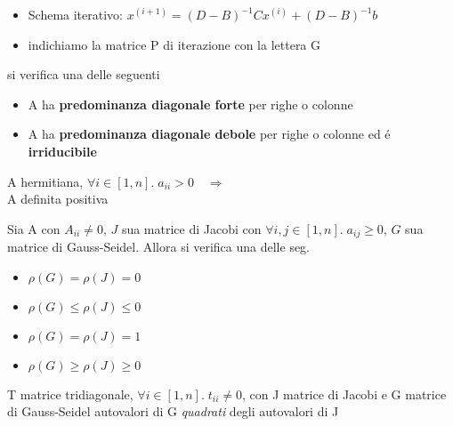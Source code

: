 \askip

\begin{itemize}
\item Schema iterativo: $ x^{(i+1)} = (D-B)^{-1}Cx^{(i)} + (D-B)^{-1}b $
\item indichiamo la matrice P di iterazione con la lettera G
\end{itemize}

\askip

 si verifica una delle seguenti
\begin{itemize}
\item A ha \textbf{predominanza diagonale forte} per righe o colonne
\item A ha \textbf{predominanza diagonale debole} per righe o colonne ed \'e \textbf{irriducibile}
\end{itemize}

\askip

A hermitiana, $ \forall i \in [1,n]. \; a_{ii} > 0 \quad \Rightarrow $ \\
 A definita positiva

\askip

 Sia A con $ A_{ii} \neq 0 $, $ J $ sua matrice di Jacobi con $ \forall i,j \in [1,n]. \; a_{ij} \geq 0 $, $ G $ sua matrice di Gauss-Seidel. Allora si verifica una delle seg.
\begin{itemize}
\item $ \rho(G) = \rho(J) = 0 $
\item $ \rho(G) \leq \rho(J) \leq 0 $
\item $ \rho(G) = \rho(J) = 1 $
\item $ \rho(G) \geq \rho(J) \geq 0 $
\end{itemize}

\askip

T matrice tridiagonale, $ \forall i \in [1,n]. \; t_{ii} \neq 0 $, con J matrice di Jacobi e G matrice di Gauss-Seidel \ftheo{$ \Rightarrow $} autovalori di G \emph{quadrati} degli autovalori di J